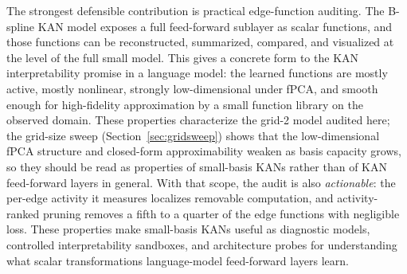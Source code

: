 \documentclass{article}
\begin{document}
The strongest defensible contribution is practical edge-function auditing. The B-spline KAN model exposes a full feed-forward sublayer as scalar functions, and those functions can be reconstructed, summarized, compared, and visualized at the level of the full small model. This gives a concrete form to the KAN interpretability promise in a language model: the learned functions are mostly active, mostly nonlinear, strongly low-dimensional under fPCA, and smooth enough for high-fidelity approximation by a small function library on the observed domain. These properties characterize the grid-2 model audited here; the grid-size sweep (Section~\ref{sec:gridsweep}) shows that the low-dimensional fPCA structure and closed-form approximability weaken as basis capacity grows, so they should be read as properties of small-basis KANs rather than of KAN feed-forward layers in general. With that scope, the audit is also \emph{actionable}: the per-edge activity it measures localizes removable computation, and activity-ranked pruning removes a fifth to a quarter of the edge functions with negligible loss. These properties make small-basis KANs useful as diagnostic models, controlled interpretability sandboxes, and architecture probes for understanding what scalar transformations language-model feed-forward layers learn.
\end{document}
